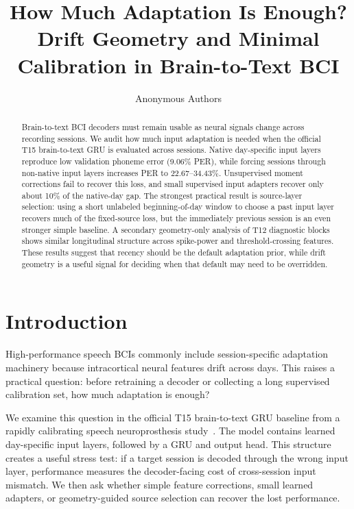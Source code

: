 \documentclass{article}
\title{How Much Adaptation Is Enough?\\Drift Geometry and Minimal Calibration in Brain-to-Text BCI}
\author{Anonymous Authors}
\begin{document}
\maketitle

\begin{abstract}
Brain-to-text BCI decoders must remain usable as neural signals change across recording sessions. We audit how much input adaptation is needed when the official T15 brain-to-text GRU is evaluated across sessions. Native day-specific input layers reproduce low validation phoneme error (9.06\% PER), while forcing sessions through non-native input layers increases PER to 22.67--34.43\%. Unsupervised moment corrections fail to recover this loss, and small supervised input adapters recover only about 10\% of the native-day gap. The strongest practical result is source-layer selection: using a short unlabeled beginning-of-day window to choose a past input layer recovers much of the fixed-source loss, but the immediately previous session is an even stronger simple baseline. A secondary geometry-only analysis of T12 diagnostic blocks shows similar longitudinal structure across spike-power and threshold-crossing features. These results suggest that recency should be the default adaptation prior, while drift geometry is a useful signal for deciding when that default may need to be overridden.
\end{abstract}

\section{Introduction}
High-performance speech BCIs commonly include session-specific adaptation machinery because intracortical neural features drift across days. This raises a practical question: before retraining a decoder or collecting a long supervised calibration set, how much adaptation is enough?

We examine this question in the official T15 brain-to-text GRU baseline from a rapidly calibrating speech neuroprosthesis study~\cite{card2024accurate}. The model contains learned day-specific input layers, followed by a GRU and output head. This structure creates a useful stress test: if a target session is decoded through the wrong input layer, performance measures the decoder-facing cost of cross-session input mismatch. We then ask whether simple feature corrections, small learned adapters, or geometry-guided source selection can recover the lost performance.
\end{document}
